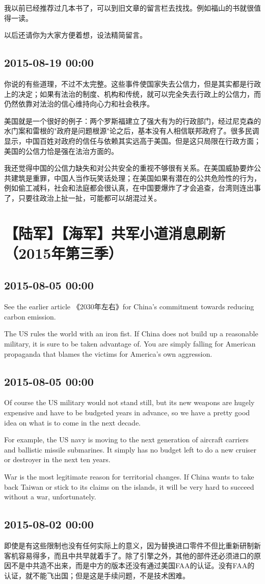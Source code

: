 \documentclass[twocolumn]{ctexart}
\begin{document}
我以前已经推荐过几本书了，可以到旧文章的留言栏去找找。例如福山的书就很值得一读。

以后还请你为大家方便着想，设法精简留言。\subsection*{2015-08-19 00:00}
你说的有些道理，不过不太完整。这些事件使国家失去公信力，但是其实都是行政上的决定；如果有法治的制度、机构和传统，就可以完全失去行政上的公信力，而仍然依靠对法治的信心维持向心力和社会秩序。

美国就是一个很好的例子：两个罗斯福建立了强大有为的行政部门，经过尼克森的水门案和雷根的"政府是问题根源"论之后，基本没有人相信联邦政府了。很多民调显示，中国百姓对政府的信任与依赖其实远高于美国。但是这只局限在行政方面；美国的公信力恰是强在法治方面的。

我还觉得中国的公信力缺失和对公共安全的重视不够很有关系。在美国威胁要炸公共建筑是重罪，中国人当作玩笑话处理；在美国如果有潜在的公共危险性的行为，例如偷工减料，社会和法庭都会很认真，在中国要爆炸了才会追查，台湾则连出事了，只要往政治上扯一扯，可能都可以胡混过关。\section*{【陆军】【海军】共军小道消息刷新（2015年第三季）}
\subsection*{2015-08-05 00:00}
See the earlier article 《2030年左右》for China's commitment towards reducing carbon emission.

The US rules the world with an iron fist. If China does not build up a reasonable military, it is sure to be taken advantage of. You are simply falling for American propaganda that blames the victims for America's own aggression.\subsection*{2015-08-05 00:00}
Of course the US military would not stand still, but its new weapons are hugely expensive and have to be budgeted years in advance, so we have a pretty good idea on what is to come in the next decade.

For example, the US navy is moving to the next generation of aircraft carriers and ballistic missile submarines. It simply has no budget left to do a new cruiser or destroyer in the next ten years.

War is the most legitimate reason for territorial changes. If China wants to take back Taiwan or stick to its claims on the islands, it will be very hard to succeed without a war, unfortunately.\subsection*{2015-08-02 00:00}
即使是有这些限制也没有任何实际上的意义，因为替换进口零件不但比重新研制新客机容易得多，而且中共早就着手了。除了引擎之外，其他的部件还必须进口的原因不是中共造不出来，而是中方的版本还没有通过美国FAA的认证。没有FAA的认证，就不能飞出国；但是这是手续问题，不是技术困难。
\end{document}
